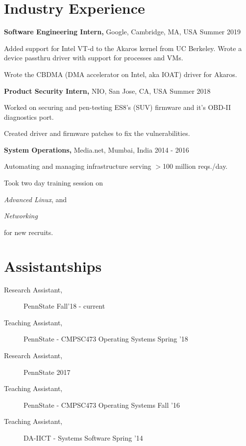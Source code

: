 \documentclass[margin]{res}
\begin{document}
\begin{resume}
\section{Industry Experience}

{\bf Software Engineering Intern,} Google, Cambridge, MA, USA
\hfill Summer  2019 %
\begin{itemizeexp}
    \item Added support for Intel VT-d to the Akaros kernel from UC Berkeley.
    Wrote a device passthru driver with support for processes and VMs.
    \item Wrote the CBDMA (DMA accelerator on Intel, aka IOAT) driver for
    Akaros.
\end{itemizeexp}

{\bf Product Security Intern,} NIO, San Jose, CA, USA
\hfill Summer 2018 %
\begin{itemizeexp}
    \item Worked on securing and pen-testing ES8's (SUV) firmware and it's OBD-II diagnostics port.
    \item Created driver and firmware patches to fix the vulnerabilities.
\end{itemizeexp}

{\bf System Operations,} Media.net, Mumbai, India
\hfill 2014 - 2016 %
\begin{itemizeexp}
    \item Automating and managing infrastructure serving $>$100 million reqs./day.
    \item Took two day training session on 
    \begin{enumerate*}[label=(\roman*)]
      \item \textit{Advanced Linux}, and
      \item \textit{Networking}
    \end{enumerate*}
     for new recruits.
\end{itemizeexp}

\section{Assistantships} 
\begin{description}
    \item[Research Assistant,] PennState \hfill Fall'18 - current
    \item[Teaching Assistant,] PennState - CMPSC473 Operating Systems \hfill Spring '18 %
    \item[Research Assistant,] PennState \hfill 2017
    \item[Teaching Assistant,] PennState - CMPSC473 Operating Systems \hfill Fall '16 %
    \item[Teaching Assistant,] DA-IICT - Systems Software \hfill Spring '14 %
\end{description}


\end{resume}
\end{document}
